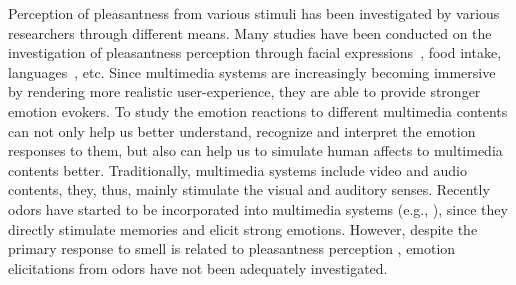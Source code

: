 %




Perception of pleasantness from various stimuli has been investigated by various researchers through different means. Many studies have been conducted on the investigation of pleasantness perception through facial expressions~\cite{lyons1998coding}, food intake\cite{de2003taste}, languages~\cite{bellezza1986words}, etc. Since multimedia systems are increasingly becoming immersive by rendering more realistic user-experience, they are able to provide stronger emotion evokers. To study the emotion reactions to different multimedia contents can not only help us better understand, recognize and interpret the emotion responses to them, but also can help us to simulate human affects to multimedia contents better. Traditionally, multimedia systems include video and audio contents, they, thus, mainly stimulate the visual and auditory senses. Recently odors have started to be incorporated into multimedia systems (e.g., \cite{nakamoto2011olfactory,nakamoto2008cooking,richard2006multi}), since they directly stimulate memories and elicit strong emotions. However, despite the primary response to smell is related to pleasantness perception \cite{gulas1995right}, emotion elicitations from odors have not been adequately investigated. 


